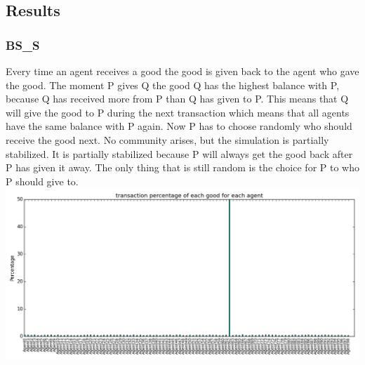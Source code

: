 \documentclass[twoside,openright]{uva-bachelor-thesis}
\begin{document}
\subsection{Results}

\subsubsection{BS\_S}
Every time an agent receives a good the good is given back to the agent who gave the good. The moment P gives Q the good Q has the highest balance with P, because Q has received more from P than Q has given to P. This means that Q will give the good to P during the next transaction which means that all agents have the same balance with P again. Now P has to choose randomly who should receive the good next. No community arises, but the simulation is partially stabilized. It is partially stabilized because P will always get the good back after P has given it away. The only thing that is still random is the choice for P to who P should give to. \\
\includegraphics[scale=0.4]{experiment_images/BR_BS_S}
\end{document}
